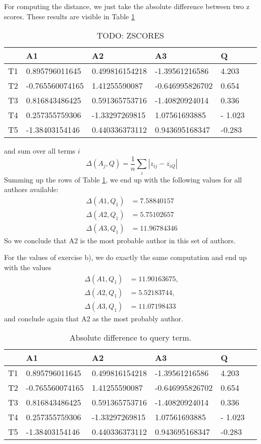 \documentclass[11pt]{article}
\begin{document}
For computing the distance, we just take the
absolute difference between two z scores. These results are visible in Table \ref{table:zscores}
\begin{table}[h]
\center
\begin{tabular}{|l|l|l|l|l|l|}
\hline
	 & A1 & A2 & A3 & Q \\
	 \hline
T1 & 0.895796011645 & 0.499816154218 & -1.39561216586 & 4.203 \\
 \hline 
T2 & -0.765560074165 & 1.41255590087 & -0.646995826702 & 0.654\\
 \hline 
T3 & 0.816843486425 & 0.591365753716 & -1.40820924014 & 0.336\\
 \hline 
T4 & 0.257355759306 & -1.33297269815 & 1.07561693885 & - 1.023\\
 \hline 
T5 & -1.38403154146 & 0.440336373112 & 0.943695168347 & -0.283 \\
\hline
\end{tabular}
\caption{TODO: ZSCORES}
\label{table:zscores}
\end{table}
and sum over all terms $i$
\begin{equation}
	\Delta(A_j, Q) = \frac{1}{n} \sum_i | z_{ij} - z_{iQ} |
\end{equation}
Summing up the rows of Table \ref{table:zscores}, we end up with the following values for all authors available:
\begin{align*}
	 \Delta(A1, Q_1) &= 7.58840157 \\
	 \Delta(A2, Q_1) &=   5.75102657 \\
	 \Delta(A3, Q_1) &=   11.96784346
\end{align*}
So we conclude that A2 is the most probable author in this set of authors.

For the values of exercise b), we do exactly the same computation and end up with the values
\begin{align*}
	 \Delta(A1, Q_1) &= 11.90163675, \\
	 \Delta(A2, Q_1) &=   5.52183744, \\
	 \Delta(A3, Q_1) &=   11.07198433
\end{align*}
and conclude again that A2 as the most probably author.
\begin{table}
\center
\begin{tabular}{|l|l|l|l|l|l|}
\hline
	 & A1 & A2 & A3 & Q \\
	 \hline
T1 & 0.895796011645 & 0.499816154218 & -1.39561216586 & 4.203 \\
 \hline 
T2 & -0.765560074165 & 1.41255590087 & -0.646995826702 & 0.654\\
 \hline 
T3 & 0.816843486425 & 0.591365753716 & -1.40820924014 & 0.336\\
 \hline 
T4 & 0.257355759306 & -1.33297269815 & 1.07561693885 & - 1.023\\
 \hline 
T5 & -1.38403154146 & 0.440336373112 & 0.943695168347 & -0.283 \\
\hline
\end{tabular}
\caption{Absolute difference to query term.}
\label{table:rel_freq}
\end{table}
\end{document}
